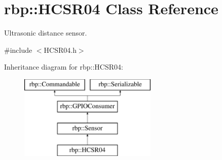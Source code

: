 \hypertarget{classrbp_1_1HCSR04}{}\section{rbp\+:\+:H\+C\+S\+R04 Class Reference}
\label{classrbp_1_1HCSR04}


Ultrasonic distance sensor.  




{\ttfamily \#include $<$H\+C\+S\+R04.\+h$>$}

Inheritance diagram for rbp\+:\+:H\+C\+S\+R04\+:\begin{figure}[H]
\begin{center}
\leavevmode
\includegraphics[height=4.000000cm]{classrbp_1_1HCSR04}
\end{center}
\end{figure}

